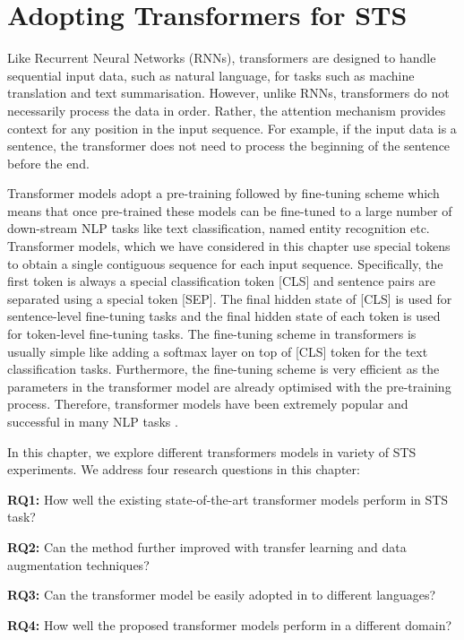 \chapter{\label{cha:sts_transformers}Adopting Transformers for STS}


Like Recurrent Neural Networks (RNNs), transformers are designed to handle sequential input data, such as natural language, for tasks such as machine translation and text summarisation. However, unlike RNNs, transformers do not necessarily process the data in order. Rather, the attention mechanism provides context for any position in the input sequence. For example, if the input data is a sentence, the transformer does not need to process the beginning of the sentence before the end. 


Transformer models adopt a pre-training followed by fine-tuning scheme which means that once pre-trained these models can be fine-tuned to a large number of down-stream NLP tasks like text classification, named entity recognition etc.  Transformer models, which we have considered in this chapter use special tokens to obtain a single contiguous sequence for each input sequence. Specifically, the first token is always a special classification token \textsc{[CLS]} and sentence pairs are separated using a special token \textsc{[SEP]}. The final hidden state of \textsc{[CLS]}  is used for sentence-level fine-tuning tasks and the final hidden state of each token is used for token-level fine-tuning tasks. The fine-tuning scheme in transformers is usually simple like adding a softmax layer on top of \textsc{[CLS]} token for the text classification tasks. Furthermore, the fine-tuning scheme is very efficient as the parameters in the transformer model are already optimised with the pre-training process. Therefore, transformer models have been extremely popular and successful in many NLP tasks \cite{devlin-etal-2019-bert}. 

In this chapter, we explore different transformers models in variety of STS experiments. 
We address four research questions in this chapter:

\textbf{RQ1:} How well the existing state-of-the-art transformer models perform in STS task? 

\textbf{RQ2:} Can the method further improved with transfer learning and data augmentation techniques?

\textbf{RQ3:} Can the transformer model be easily adopted in to different languages?

\textbf{RQ4:} How well the proposed transformer models perform in a different domain? 

